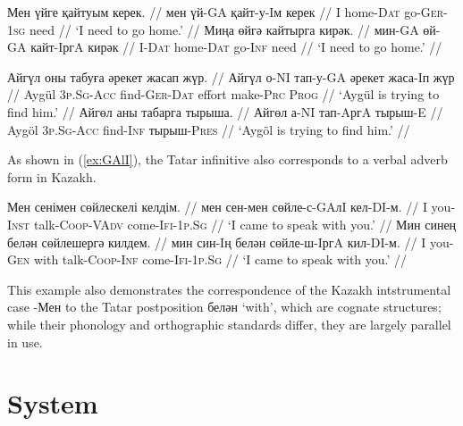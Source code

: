 \documentclass[a4paper,11pt]{article}
\newcommand{\gmk}[1]{{\qipb\scshape #1}}
\newcommand{\eng}[1]{`#1'}
\begin{document}
\pex[everygla=,everyglb=,everyglc=,aboveglbskip=0pt,aboveglftskip=0ex]  %
\label{ex:kerek}
\a
\begingl
\gla Мен үйге қайтуым керек. //
\glb мен үй-GA қайт-у-Iм керек //
\glb I home-\gmk{Dat} go-\gmk{Ger}-\gmk{1sg} need //
\glft \eng{I need to go home.} //
\endgl
\a
\begingl
\gla Миңа өйгә кайтырга кирәк. //
\glb мин-GA өй-GA кайт-IргA кирәк //
\glb I-\gmk{Dat} home-\gmk{Dat} go-\gmk{Inf} need //
\glft \eng{I need to go home.} //
\endgl
\xe

\pex[everygla=,everyglb=,everyglc=,aboveglbskip=0pt,aboveglftskip=0ex]  %
\label{ex:try}
\a
\begingl
\gla Айгүл оны табуға әрекет жасап жүр. //
\glb Айгүл о-NI тап-у-GA әрекет жаса-Iп жүр //
\glb Aygül \gmk{3p.Sg}-\gmk{Acc} find-\gmk{Ger}-\gmk{Dat} effort make-\gmk{Prc} \gmk{Prog} //
\glft \eng{Aygül is trying to find him.} //
\endgl
\a
\begingl
\gla Айгөл аны табарга тырыша. //
\glb Айгөл а-NI тап-AргA тырыш-E //
\glb Aygöl \gmk{3p.Sg}-\gmk{Acc} find-\gmk{Inf} тырыш-\gmk{Pres} //
\glft \eng{Aygöl is trying to find him.} //
\endgl
\xe

As shown in (\ref{ex:GAlI}), the Tatar infinitive also corresponds to a verbal adverb form in Kazakh.

\pex[everygla=,everyglb=,everyglc=,aboveglbskip=0pt,aboveglftskip=0ex]  %
\label{ex:GAlI}
\a
\begingl
\gla Мен сенімен сөйлескелі келдім. //
\glb мен сен-мен сөйле-с-GAлI кел-DI-м. //
\glb I you-\gmk{Inst} talk-\gmk{Coop}-\gmk{VAdv} come-\gmk{Ifi}-\gmk{1p.Sg} //
\glft \eng{I came to speak with you.} //
\endgl
\a
\begingl
\gla Мин синең белән сөйлешергә килдем. //
\glb мин син-Iң белән сөйле-ш-IргA кил-DI-м. //
\glb I you-\gmk{Gen} with talk-\gmk{Coop}-\gmk{Inf} come-\gmk{Ifi}-\gmk{1p.Sg} //
\glft \eng{I came to speak with you.} //
\endgl
\xe

This example also demonstrates the correspondence of the Kazakh intstrumental case -Мен to the Tatar postposition белән \eng{with}, which are cognate structures; while their phonology and orthographic standards differ, they are largely parallel in use.

\section{System}
\label{sec:sys}
\end{document}
